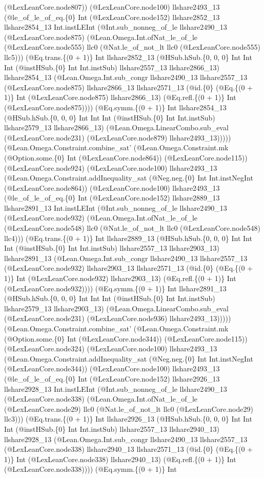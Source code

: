 \documentclass[11pt]{article}
\begin{document}
(@LexLeanCore.node807)) (@LexLeanCore.node100) llshare2493\_13 (@le\_of\_le\_of\_eq.\{0\} Int (@LexLeanCore.node152) llshare2852\_13 llshare2854\_13 Int.instLEInt (@Int.sub\_nonneg\_of\_le llshare2490\_13 (@LexLeanCore.node875) (@Lean.Omega.Int.ofNat\_le\_of\_le (@LexLeanCore.node555) llc0 (@Nat.le\_of\_not\_lt llc0 (@LexLeanCore.node555) llc5))) (@Eq.trans.\{(0 + 1)\} Int llshare2852\_13 (@HSub.hSub.\{0, 0, 0\} Int Int Int (@instHSub.\{0\} Int Int.instSub) llshare2557\_13 llshare2866\_13) llshare2854\_13 (@Lean.Omega.Int.sub\_congr llshare2490\_13 llshare2557\_13 (@LexLeanCore.node875) llshare2866\_13 llshare2571\_13 (@id.\{0\} (@Eq.\{(0 + 1)\} Int (@LexLeanCore.node875) llshare2866\_13) (@Eq.refl.\{(0 + 1)\} Int (@LexLeanCore.node875)))) (@Eq.symm.\{(0 + 1)\} Int llshare2854\_13 (@HSub.hSub.\{0, 0, 0\} Int Int Int (@instHSub.\{0\} Int Int.instSub) llshare2579\_13 llshare2866\_13) (@Lean.Omega.LinearCombo.sub\_eval (@LexLeanCore.node231) (@LexLeanCore.node879) llshare2493\_13))))) (@Lean.Omega.Constraint.combine\_sat' (@Lean.Omega.Constraint.mk (@Option.some.\{0\} Int (@LexLeanCore.node864)) (@LexLeanCore.node115)) (@LexLeanCore.node924) (@LexLeanCore.node100) llshare2493\_13 (@Lean.Omega.Constraint.addInequality\_sat (@Neg.neg.\{0\} Int Int.instNegInt (@LexLeanCore.node864)) (@LexLeanCore.node100) llshare2493\_13 (@le\_of\_le\_of\_eq.\{0\} Int (@LexLeanCore.node152) llshare2889\_13 llshare2891\_13 Int.instLEInt (@Int.sub\_nonneg\_of\_le llshare2490\_13 (@LexLeanCore.node932) (@Lean.Omega.Int.ofNat\_le\_of\_le (@LexLeanCore.node548) llc0 (@Nat.le\_of\_not\_lt llc0 (@LexLeanCore.node548) llc4))) (@Eq.trans.\{(0 + 1)\} Int llshare2889\_13 (@HSub.hSub.\{0, 0, 0\} Int Int Int (@instHSub.\{0\} Int Int.instSub) llshare2557\_13 llshare2903\_13) llshare2891\_13 (@Lean.Omega.Int.sub\_congr llshare2490\_13 llshare2557\_13 (@LexLeanCore.node932) llshare2903\_13 llshare2571\_13 (@id.\{0\} (@Eq.\{(0 + 1)\} Int (@LexLeanCore.node932) llshare2903\_13) (@Eq.refl.\{(0 + 1)\} Int (@LexLeanCore.node932)))) (@Eq.symm.\{(0 + 1)\} Int llshare2891\_13 (@HSub.hSub.\{0, 0, 0\} Int Int Int (@instHSub.\{0\} Int Int.instSub) llshare2579\_13 llshare2903\_13) (@Lean.Omega.LinearCombo.sub\_eval (@LexLeanCore.node231) (@LexLeanCore.node936) llshare2493\_13))))) (@Lean.Omega.Constraint.combine\_sat' (@Lean.Omega.Constraint.mk (@Option.some.\{0\} Int (@LexLeanCore.node344)) (@LexLeanCore.node115)) (@LexLeanCore.node324) (@LexLeanCore.node100) llshare2493\_13 (@Lean.Omega.Constraint.addInequality\_sat (@Neg.neg.\{0\} Int Int.instNegInt (@LexLeanCore.node344)) (@LexLeanCore.node100) llshare2493\_13 (@le\_of\_le\_of\_eq.\{0\} Int (@LexLeanCore.node152) llshare2926\_13 llshare2928\_13 Int.instLEInt (@Int.sub\_nonneg\_of\_le llshare2490\_13 (@LexLeanCore.node338) (@Lean.Omega.Int.ofNat\_le\_of\_le (@LexLeanCore.node29) llc0 (@Nat.le\_of\_not\_lt llc0 (@LexLeanCore.node29) llc3))) (@Eq.trans.\{(0 + 1)\} Int llshare2926\_13 (@HSub.hSub.\{0, 0, 0\} Int Int Int (@instHSub.\{0\} Int Int.instSub) llshare2557\_13 llshare2940\_13) llshare2928\_13 (@Lean.Omega.Int.sub\_congr llshare2490\_13 llshare2557\_13 (@LexLeanCore.node338) llshare2940\_13 llshare2571\_13 (@id.\{0\} (@Eq.\{(0 + 1)\} Int (@LexLeanCore.node338) llshare2940\_13) (@Eq.refl.\{(0 + 1)\} Int (@LexLeanCore.node338)))) (@Eq.symm.\{(0 + 1)\} Int 
\end{document}
